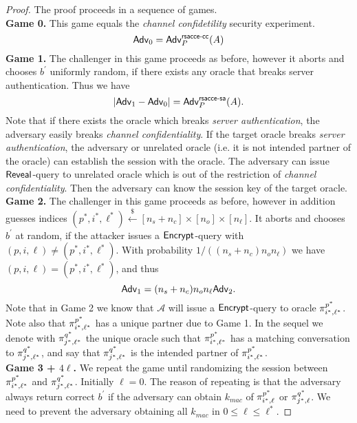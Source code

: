 \begin{proof}
 The proof proceeds in a sequence of games. \vspace{10pt}\\
 \textbf{Game 0.} This game equals the \textit{channel confidetility} security experiment.
 \begin{equation}
  \mathsf{Adv}_0 = \mathsf{Adv}^{\mathsf{rsacce\textsc{-} cc}}_{P}(A)
 \end{equation}%
%
%
 \textbf{Game 1.} The challenger in this game proceeds as before, however it aborts and chooses $b^{\prime}$ uniformly random, if there exists any oracle that breaks server authentication. Thus we have
 \begin{equation}
  |\mathsf{Adv}_1 - \mathsf{Adv}_0| = \mathsf{Adv}^{\mathsf{rsacce\textsc{-} sa}}_{P}(A).
 \end{equation}%
 Note that if there exists the oracle which breaks \textit{server authentication}, the adversary easily breaks \textit{channel confidentiality}. If the target oracle breaks \textit{server authentication}, the adversary or unrelated oracle (i.e. it is not intended partner of the oracle) can establish the session with the oracle. The adversary can issue $\mathsf{Reveal}$-query to unrelated oracle which is out of the restriction of \textit{channel confidentiality}. Then the adversary can know the session key of the target oracle.
\vspace{10pt}\\%
%
%
 \textbf{Game 2.} The challenger in this game proceeds as before, however in addition guesses indices $(p^{\ast}, i^{\ast}, \ell^{\ast}) \xleftarrow{\$} [n_s + n_c] \times [n_o] \times [n_{\ell}]$. It aborts and chooses $b^{\prime}$ at random, if the attacker issues a $\mathsf{Encrypt}$-query with $(p,i,\ell) \neq (p^{\ast}, i^{\ast}, \ell^{\ast})$. With probability $1/((n_s+n_c)n_o n_{\ell})$ we have $(p,i,\ell) = (p^{\ast}, i^{\ast}, \ell^{\ast})$, and thus
 \begin{equation}
  \mathsf{Adv}_1 = (n_s + n_c) n_o n_{\ell}\mathsf{Adv}_2.
 \end{equation}%
 Note that in Game 2 we know that $\mathcal{A}$ will issue a $\mathsf{Encrypt}$-query to oracle $\pi^{p^{\ast}}_{i^{\ast},\ell^{\ast}}$. Note also that $\pi^{p^{\ast}}_{i^{\ast},\ell^{\ast}}$ has a unique partner due to Game 1. In the sequel we denote with $\pi^{q^{\ast}}_{j^{\ast},\ell^{\ast}}$ the unique oracle such that $\pi^{p^{\ast}}_{i^{\ast},\ell^{\ast}}$ has a matching conversation to $\pi^{q^{\ast}}_{j^{\ast},\ell^{\ast}}$, and say that $\pi^{q^{\ast}}_{j^{\ast},\ell^{\ast}}$ is the intended partner of $\pi^{p^{\ast}}_{i^{\ast},\ell^{\ast}}$.
\vspace{10pt}\\%
%
%
 \textbf{Game 3 + $4\ell$.} We repeat the game until randomizing the session between $\pi^{p^{\ast}}_{i^{\ast},\ell^{\ast}}$ and $\pi^{q^{\ast}}_{j^{\ast},\ell^{\ast}}$. Initially $\ell = 0$. The reason of repeating is that the adversary always return correct $b^{\prime}$ if the adversary can obtain $k_{mac}$ of $\pi^{p^{\ast}}_{i^{\ast},\ell}$ or $\pi^{q^{\ast}}_{j^{\ast},\ell}$. We need to prevent the adversary obtaining all $k_{mac}$ in $ 0 \leq \ell \leq \ell^{\ast}$.

\end{proof}
